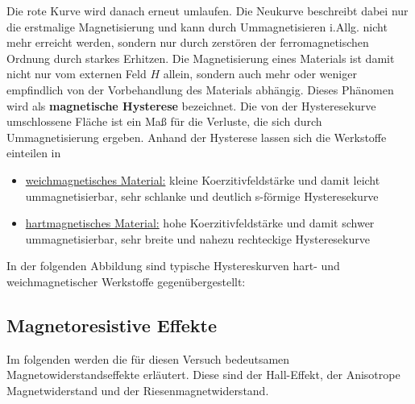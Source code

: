 \documentclass[german,  %
parskip=full,  %
]{scrartcl}
\begin{document}
Die rote Kurve wird danach erneut umlaufen. Die Neukurve beschreibt dabei nur die erstmalige Magnetisierung und kann durch Ummagnetisieren i.Allg. nicht mehr erreicht werden, sondern nur durch zerstören der ferromagnetischen Ordnung durch starkes Erhitzen. Die Magnetisierung eines Materials ist damit nicht nur vom externen Feld \(H\) allein, sondern auch mehr oder weniger empfindlich von der Vorbehandlung des Materials abhängig. Dieses Phänomen wird als \textbf{magnetische Hysterese} bezeichnet. Die von der Hysteresekurve umschlossene Fläche ist ein Maß für die Verluste, die sich durch Ummagnetisierung ergeben. Anhand der Hysterese lassen sich die Werkstoffe einteilen in
\begin{itemize}
\item \underline{weichmagnetisches Material:} kleine Koerzitivfeldstärke und damit leicht ummagnetisierbar, sehr schlanke und deutlich s-förmige Hysteresekurve
\item \underline{hartmagnetisches Material:} hohe Koerzitivfeldstärke und damit schwer ummagnetisierbar, sehr breite und nahezu rechteckige Hysteresekurve
\end{itemize}
In der folgenden Abbildung sind typische Hystereskurven hart- und weichmagnetischer Werkstoffe gegenübergestellt:
\subsection{Magnetoresistive Effekte}
Im folgenden werden die für diesen Versuch bedeutsamen Magnetowiderstandseffekte erläutert. Diese sind der Hall-Effekt, der Anisotrope Magnetwiderstand und der Riesenmagnetwiderstand.
\end{document}
